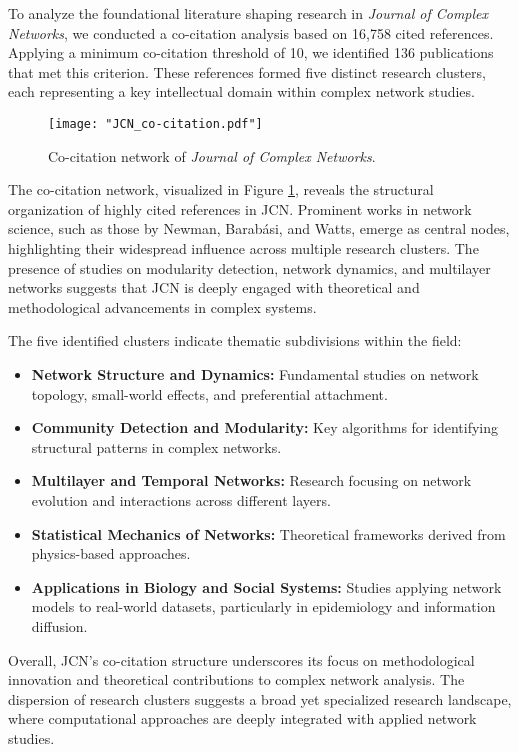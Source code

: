 \documentclass[twocolumn]{article}
\begin{document}
		To analyze the foundational literature shaping research in \textit{Journal of Complex Networks}, we conducted a co-citation analysis based on 16,758 cited references. Applying a minimum co-citation threshold of 10, we identified 136 publications that met this criterion. These references formed five distinct research clusters, each representing a key intellectual domain within complex network studies.
		
		\begin{figure}[htbp]
			\centering
			\texttt{[image: "JCN\_co-citation.pdf"]}
			\caption{Co-citation network of \textit{Journal of Complex Networks}.}
			\label{fig.fig10}
		\end{figure}
		
		The co-citation network, visualized in Figure \ref{fig.fig10}, reveals the structural organization of highly cited references in JCN. Prominent works in network science, such as those by Newman, Barabási, and Watts, emerge as central nodes, highlighting their widespread influence across multiple research clusters. The presence of studies on modularity detection, network dynamics, and multilayer networks suggests that JCN is deeply engaged with theoretical and methodological advancements in complex systems.
		
		The five identified clusters indicate thematic subdivisions within the field:
		\begin{itemize}
			\item \textbf{Network Structure and Dynamics:} Fundamental studies on network topology, small-world effects, and preferential attachment.
			\item \textbf{Community Detection and Modularity:} Key algorithms for identifying structural patterns in complex networks.
			\item \textbf{Multilayer and Temporal Networks:} Research focusing on network evolution and interactions across different layers.
			\item \textbf{Statistical Mechanics of Networks:} Theoretical frameworks derived from physics-based approaches.
			\item \textbf{Applications in Biology and Social Systems:} Studies applying network models to real-world datasets, particularly in epidemiology and information diffusion.
		\end{itemize}
		
		Overall, JCN’s co-citation structure underscores its focus on methodological innovation and theoretical contributions to complex network analysis. The dispersion of research clusters suggests a broad yet specialized research landscape, where computational approaches are deeply integrated with applied network studies.
		
\end{document}
